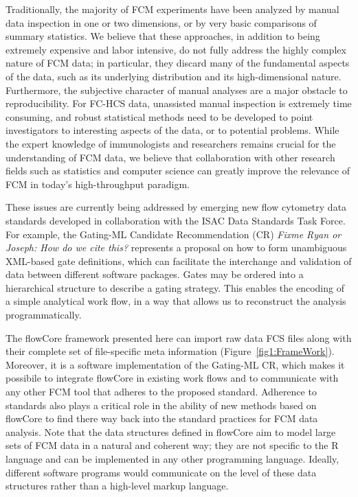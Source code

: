 \documentclass[12pt]{article}
\begin{document}
Traditionally, the majority of FCM experiments have been analyzed by
manual data inspection in one or two dimensions, or by very basic
comparisons of summary statistics. We believe that these approaches,
in addition to being extremely expensive and labor intensive, do not
fully address the highly complex nature of FCM data; in particular,
they discard many of the fundamental aspects of the data, such as its
underlying distribution and its high-dimensional nature. Furthermore,
the subjective character of manual analyses are a major obstacle to
reproducibility. For FC-HCS data, unassisted manual inspection is
extremely time consuming, and robust statistical methods need to be
developed to point investigators to interesting aspects of the data,
or to potential problems. While the expert knowledge of immunologists
and researchers remains crucial for the understanding of FCM data, we
believe that collaboration with other research fields such as
statistics and computer science can greatly improve the relevance of
FCM in today's high-throughput paradigm.

These issues are currently being addressed by emerging new flow
cytometry data standards developed in collaboration with the ISAC Data
Standards Task Force.  For example, the Gating-ML Candidate
Recommendation (CR) \textit{Fixme Ryan or Joseph: How do we cite
  this?}  represents a proposal on how to form unambiguous XML-based
gate definitions, which can facilitate the interchange and validation
of data between different software packages. Gates may be ordered into
a hierarchical structure to describe a gating strategy. This enables
the encoding of a simple analytical work flow, in a way that allows us
to reconstruct the analysis programmatically.

The flowCore framework presented here can import raw data FCS files
along with their complete set of file-specific meta information
(Figure~\ref{fig1:FrameWork}).  Moreover, it is a software
implementation of the Gating-ML CR, which makes it possibile to
integrate flowCore in existing work flows and to communicate with
any other FCM tool that adheres to the proposed standard. Adherence
to standards also plays a critical role in the ability of new methods
based on flowCore to find there way back into the standard practices
for FCM data analysis.  Note that the data structures defined in
flowCore aim to model large sets of FCM data in a natural and coherent
way; they are not specific to the R language and can be implemented in
any other programming language. Ideally, different software programs
would communicate on the level of these data structures rather than a
high-level markup language.
\end{document}
